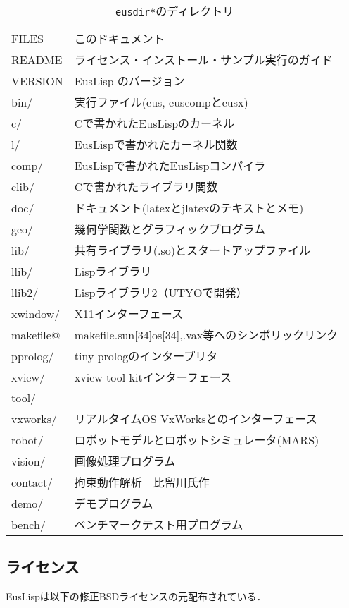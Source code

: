 \begin{table}
\caption{{\tt *eusdir*}のディレクトリ\label{Directories}}
\begin{center}
{\footnotesize
\begin{tabular}{|l | l|}\hline 
FILES &  このドキュメント \\
README &  ライセンス・インストール・サンプル実行のガイド\\
VERSION &  EusLisp のバージョン\\
bin/ &  実行ファイル(eus, euscompとeusx)\\
c/ &  Cで書かれたEusLispのカーネル\\
l/ &  EusLispで書かれたカーネル関数\\
comp/ &  EusLispで書かれたEusLispコンパイラ\\
clib/ &  Cで書かれたライブラリ関数\\
doc/ &  ドキュメント(latexとjlatexのテキストとメモ)\\
geo/ &  幾何学関数とグラフィックプログラム\\
lib/ & 共有ライブラリ(.so)とスタートアップファイル\\
llib/ &  Lispライブラリ\\
llib2/ &  Lispライブラリ2（UTYOで開発）\\
xwindow/ &  X11インターフェース\\
makefile@ &  makefile.sun[34]os[34],.vax等へのシンボリックリンク\\
pprolog/ &  tiny prologのインタープリタ\\
xview/ &  xview tool kitインターフェース\\
tool/ & \\
vxworks/ & リアルタイムOS VxWorksとのインターフェース\\
robot/ & ロボットモデルとロボットシミュレータ(MARS)\\
vision/ &  画像処理プログラム\\
contact/ & 拘束動作解析　比留川氏作
\cite{Hirukawa:1991a,Hirukawa:1991b,Hirukawa:1991c}\\
demo/ &  デモプログラム\\
bench/ &  ベンチマークテスト用プログラム\\ \hline
\end{tabular}
}
\end{center}
\end{table}

\subsection{\label{License}ライセンス}
EusLispは以下の修正BSDライセンスの元配布されている．

